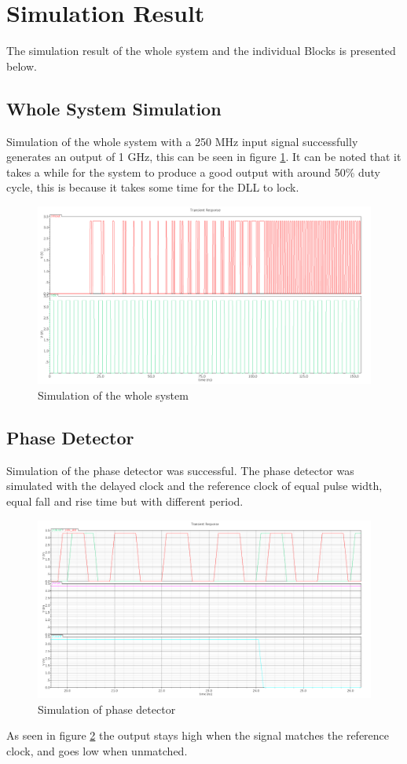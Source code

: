 \documentclass[a4paper,12pt]{article} \usepackage{graphicx}
\begin{document}
\section{Simulation Result}
The simulation result of the whole system and the individual Blocks is
presented below.
\subsection{Whole System Simulation}
Simulation of the whole system with a 250 MHz input signal successfully
generates an output of 1 GHz, this can be seen in figure \ref{fig:high_sim}.
It can be noted that it takes a while for the system to produce a good output
with around 50\% duty cycle, this is because it takes some time for the DLL
to lock.
\begin{figure}[hb]
        \centering
        \includegraphics[width=\textwidth]{../Bilder/high_level_sim.png}
        \caption{Simulation of the whole system}
        \label{fig:high_sim}
\end{figure}

\subsection{Phase Detector}
Simulation of the phase detector was successful.  The phase detector was simulated with the delayed clock and the reference clock of equal pulse
width, equal fall and rise time but with different period. 
\begin{figure}[hb]
        \centering
        \includegraphics[width=\textwidth]{../Bilder/PD_closeup_sim.png}
        \caption{Simulation of phase detector}
        \label{fig:PD_sim}
\end{figure}
As seen in figure \ref{fig:PD_sim} the output stays high when the
signal matches the reference clock, and goes low when unmatched.
\end{document}

